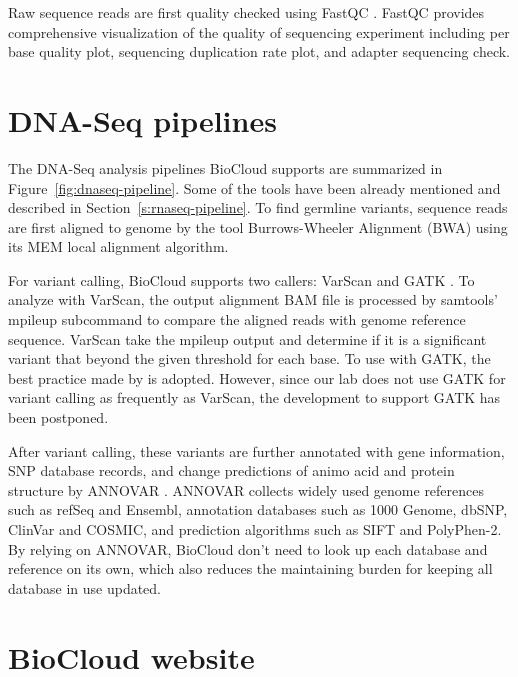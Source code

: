 Raw sequence reads are first quality checked using FastQC \cite{:fastqc}.
FastQC provides comprehensive visualization of the quality of sequencing
experiment including per base quality plot, sequencing duplication rate plot,
and adapter sequencing check.



\section{DNA-Seq pipelines}
\label{s:dnaseq-pipeline}

The DNA-Seq analysis pipelines BioCloud supports are summarized in
Figure~\ref{fig:dnaseq-pipeline}. Some of the tools have been already mentioned
and described in Section~\ref{s:rnaseq-pipeline}. To find germline variants,
sequence reads are first aligned to genome by the tool Burrows-Wheeler
Alignment (BWA) \cite{li2009:fast} using its MEM local alignment algorithm.



For variant calling, BioCloud supports two callers: VarScan
\cite{koboldt2012:varscan} and GATK
\cite{vanderauwera2013:fastq,mckenna2010:genome}. To analyze with VarScan, the
output alignment BAM file is processed by samtools' mpileup subcommand to
compare the aligned reads with genome reference sequence. VarScan take the
mpileup output and determine if it is a significant variant that beyond the
given threshold for each base. To use with GATK, the best practice
\cite{vanderauwera2013:fastq} made by \citeauthor{vanderauwera2013:fastq} is
adopted. However, since our lab does not use GATK for variant calling as
frequently as VarScan, the development to support GATK has been postponed.

After variant calling, these variants are further annotated with gene
information, SNP database records, and change predictions of animo acid and
protein structure by ANNOVAR \cite{wang2010:annovar}. ANNOVAR collects widely
used genome references such as refSeq and Ensembl, annotation databases such as
1000 Genome, dbSNP, ClinVar and COSMIC, and prediction algorithms such as SIFT
and PolyPhen-2. By relying on ANNOVAR, BioCloud don't need to look up each
database and reference on its own, which also reduces the maintaining burden
for keeping all database in use updated.



\section{BioCloud website}
\label{s:biocloud-website}

